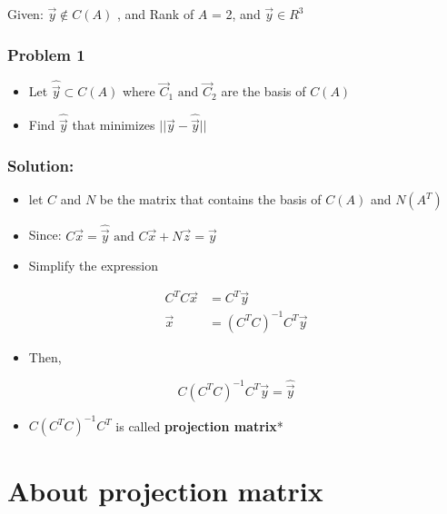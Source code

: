 \documentclass[
]{article}
\providecommand{\tightlist}{%
  \setlength{\itemsep}{0pt}\setlength{\parskip}{0pt}}
\begin{document}
Given: \(\vec{y} \notin C(A)\) , and Rank of \(A\) = 2, and
\(\vec{y} \in R^3\)

\hypertarget{problem-1}{%
\subsubsection{Problem 1}\label{problem-1}}

\begin{itemize}
\tightlist
\item
  Let \(\hat{\vec{y}} \subset C(A)\) where
  \(\vec{C}_1 \text{ and } \vec{C}_2\) are the basis of \(C(A)\)
\item
  Find \(\hat{\vec{y}}\) that minimizes \(||\vec{y}-\hat{\vec{y}}||\)
\end{itemize}

\hypertarget{solution}{%
\subsubsection{Solution:}\label{solution}}

\begin{itemize}
\tightlist
\item
  let \(C\) and \(N\) be the matrix that contains the basis of \(C(A)\)
  and \(N(A^T)\)
\item
  Since:
  \(C\vec{x}=\hat{\vec{y}} \text{   and   } C\vec{x} + N\vec{z} = \vec{y}\)
\item
  Simplify the expression
\end{itemize}

\[\begin{aligned}
C^TC\vec{x} &= C^T\vec{y} \\
\vec{x} &= (C^TC)^{-1}C^T\vec{y} 
\end{aligned}\]

\begin{itemize}
\tightlist
\item
  Then,
\end{itemize}

\[C(C^TC)^{-1}C^T\vec{y}=\hat{\vec{y}}\]

\begin{itemize}
\tightlist
\item
  \(C(C^TC)^{-1}C^T\) is called \textbf{projection matrix}*
\end{itemize}

\hypertarget{about-projection-matrix}{%
\section{About projection matrix}\label{about-projection-matrix}}
\end{document}
